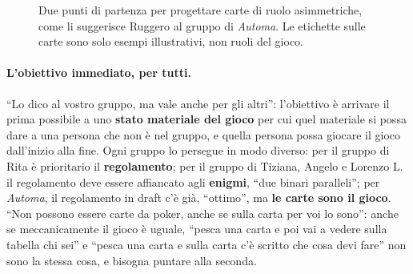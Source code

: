 \begin{figure}[htbp]
\centering
{}
\caption{Due punti di partenza per progettare carte di ruolo asimmetriche, come li
suggerisce Ruggero al gruppo di \emph{Automa}. Le etichette sulle carte sono solo
esempi illustrativi, non ruoli del gioco.}
\label{a12:fig:carte}
\end{figure}

\paragraph{L'obiettivo immediato, per tutti.} ``Lo dico al vostro gruppo, ma vale anche
per gli altri'': l'obiettivo è arrivare il prima possibile a uno \textbf{stato materiale
del gioco} per cui quel materiale si possa dare a una persona che non è nel gruppo, e
quella persona possa giocare il gioco dall'inizio alla fine. Ogni gruppo lo persegue in
modo diverso: per il gruppo di Rita è prioritario il \textbf{regolamento}; per il gruppo
di Tiziana, Angelo e Lorenzo L. il regolamento deve essere affiancato agli
\textbf{enigmi}, ``due binari paralleli''; per \emph{Automa}, il regolamento in draft c'è
già, ``ottimo'', ma \textbf{le carte sono il gioco}. ``Non possono essere carte da poker,
anche se sulla carta per voi lo sono'': anche se meccanicamente il gioco è uguale, ``pesca
una carta e poi vai a vedere sulla tabella chi sei'' e ``pesca una carta e sulla carta c'è
scritto che cosa devi fare'' non sono la stessa cosa, e bisogna puntare alla seconda.

